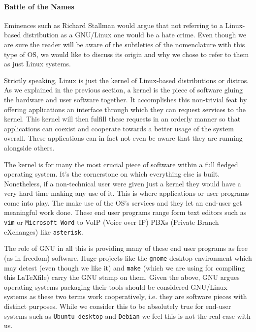             \paragraph{Battle of the Names}
                Eminences such as Richard Stallman would argue that not referring to a Linux-based distribution as a GNU/Linux one would be a hate crime. Even though we are sure the reader will be aware of the subtleties of the nomenclature with this type of OS, we would like to discuss its origin and why we chose to refer to them as just Linux systems.

                Strictly speaking, Linux is just the kernel of Linux-based distributions or distros. As we explained in the previous section, a kernel is the piece of software gluing the hardware and user software together. It accomplishes this non-trivial feat by offering applications an interface through which they can request services to the kernel. This kernel will then fulfill these requests in an orderly manner so that applications can coexist and cooperate towards a better usage of the system overall. These applications can in fact not even be aware that they are running alongside others.

                The kernel is for many the most crucial piece of software within a full fledged operating system. It's the cornerstone on which everything else is built. Nonetheless, if a non-technical user were given just a kernel they would have a very hard time making any use of it. This is where applications or user programs come into play. The make use of the OS's services and they let an end-user get meaningful work done. These end user programs range form text editors such as \texttt{vim} or \texttt{Microsoft Word} to VoIP (Voice over IP) PBXs (Private Branch eXchanges) like \texttt{asterisk}.

                The role of GNU in all this is providing many of these end user programs as free (as in freedom) software. Huge projects like the \texttt{gnome} desktop environment which may detest (even though we like it) and \texttt{make} (which we are using for compiling this \LaTeX file) carry the GNU stamp on them. Given the above, GNU argues operating systems packaging their tools should be considered GNU/Linux systems as these two terms work cooperatively, i.e. they are software pieces with distinct purposes. While we consider this to be absolutely true for end-user systems such as \texttt{Ubuntu desktop} and \texttt{Debian} we feel this is not the real case with us.

